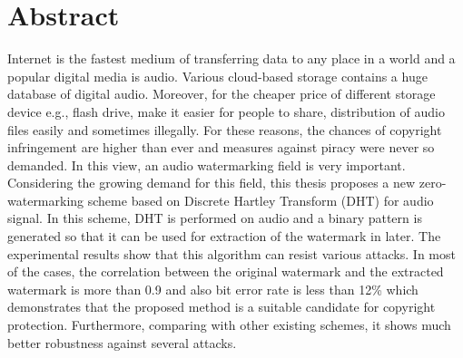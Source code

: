 \section*{Abstract}
Internet is the fastest medium of transferring data to any place in a world and a popular digital media is audio. Various cloud-based storage contains a huge database of digital audio. Moreover, for the cheaper price of different storage device e.g., flash drive, make it easier for people to share, distribution of audio files easily and sometimes illegally. For these reasons, the chances of copyright infringement are higher than ever and measures against piracy were never so demanded. In this view, an audio watermarking field is very important. Considering the growing demand for this field, this thesis proposes a new zero-watermarking scheme based on Discrete Hartley Transform (DHT) for audio signal. In this scheme, DHT is performed on audio and a binary pattern is generated so that it can be used for extraction of the watermark in later. The experimental results show that this algorithm can resist various attacks. In most of the cases, the correlation between the original watermark and the extracted watermark is more than 0.9 and also bit error rate is less than 12\% which demonstrates that the proposed method is a suitable candidate for copyright protection. Furthermore, comparing with other existing schemes, it shows much better robustness against several attacks.

%